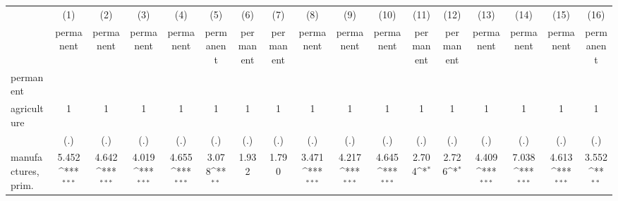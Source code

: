 {
\def\sym#1{\ifmmode^{#1}\else\(^{#1}\)\fi}
\begin{tabular}{l*{16}{c}}
\hline\hline
                    &\multicolumn{1}{c}{(1)}&\multicolumn{1}{c}{(2)}&\multicolumn{1}{c}{(3)}&\multicolumn{1}{c}{(4)}&\multicolumn{1}{c}{(5)}&\multicolumn{1}{c}{(6)}&\multicolumn{1}{c}{(7)}&\multicolumn{1}{c}{(8)}&\multicolumn{1}{c}{(9)}&\multicolumn{1}{c}{(10)}&\multicolumn{1}{c}{(11)}&\multicolumn{1}{c}{(12)}&\multicolumn{1}{c}{(13)}&\multicolumn{1}{c}{(14)}&\multicolumn{1}{c}{(15)}&\multicolumn{1}{c}{(16)}\\
                    &\multicolumn{1}{c}{permanent}&\multicolumn{1}{c}{permanent}&\multicolumn{1}{c}{permanent}&\multicolumn{1}{c}{permanent}&\multicolumn{1}{c}{permanent}&\multicolumn{1}{c}{permanent}&\multicolumn{1}{c}{permanent}&\multicolumn{1}{c}{permanent}&\multicolumn{1}{c}{permanent}&\multicolumn{1}{c}{permanent}&\multicolumn{1}{c}{permanent}&\multicolumn{1}{c}{permanent}&\multicolumn{1}{c}{permanent}&\multicolumn{1}{c}{permanent}&\multicolumn{1}{c}{permanent}&\multicolumn{1}{c}{permanent}\\
\hline
permanent           &                     &                     &                     &                     &                     &                     &                     &                     &                     &                     &                     &                     &                     &                     &                     &                     \\
agriculture         &           1         &           1         &           1         &           1         &           1         &           1         &           1         &           1         &           1         &           1         &           1         &           1         &           1         &           1         &           1         &           1         \\
                    &         (.)         &         (.)         &         (.)         &         (.)         &         (.)         &         (.)         &         (.)         &         (.)         &         (.)         &         (.)         &         (.)         &         (.)         &         (.)         &         (.)         &         (.)         &         (.)         \\
[1em]
manufactures, prim. &       5.452\sym{***}&       4.642\sym{***}&       4.019\sym{***}&       4.655\sym{***}&       3.078\sym{**} &       1.932         &       1.790         &       3.471\sym{***}&       4.217\sym{***}&       4.645\sym{***}&       2.704\sym{*}  &       2.726\sym{*}  &       4.409\sym{***}&       7.038\sym{***}&       4.613\sym{***}&       3.552\sym{**} \\

\end{tabular}}
